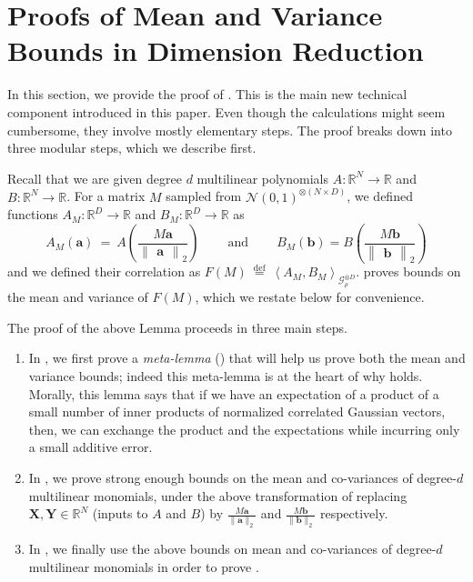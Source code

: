 \documentclass[11pt]{article}
\newcommand{\inparen}[1]{\left ( #1 \right )}
\newcommand{\inangle}[1]{\left \langle #1 \right \rangle}
\newcommand{\norm}[2]{\begin{Vmatrix} #2 \end{Vmatrix}_{#1}}
\newcommand{\defeq}{\stackrel{\mathrm{def}}{=}}
\newcommand{\sAND}{\ \mathrm{and} \ }
\newcommand{\bbR}{{\mathbb R}}
\newcommand{\ba}{{\bm a}}
\newcommand{\bb}{{\bm b}}
\newcommand{\bX}{\mathbf{X}}
\newcommand{\bY}{\mathbf{Y}}
\newcommand{\calG}{\mathcal{G}}
\newcommand{\calN}{\mathcal{N}}
\begin{document}
%
%



\appendix

\section{Proofs of Mean and Variance Bounds in Dimension Reduction}\label{sec:app_dim_red}

In this section, we provide the proof of . This is the main new technical component introduced in this paper. Even though the calculations might seem cumbersome, they involve mostly elementary steps. The proof breaks down into three modular steps, which we describe first.

Recall that we are given degree $d$ multilinear polynomials $A : \bbR^N \to \bbR$ and $B : \bbR^N \to \bbR$. For a matrix $M$ sampled from $\calN(0,1)^{\otimes (N \times D)}$, we defined functions $A_M : \bbR^D \to \bbR$ and $B_M : \bbR^D \to \bbR$ as
\[A_M(\ba) ~=~ A\inparen{\frac{M \ba}{\norm{2}{\ba}}} \qquad \sAND \qquad B_M(\bb) = B\inparen{\frac{M \bb}{\norm{2}{\bb}}}\]
and we defined their correlation as $F(M) ~\defeq~ \inangle{A_M, B_M}_{\calG_{\rho}^{\otimes D}}$.  proves bounds on the mean and variance of $F(M)$, which we restate below for convenience.

\meanvarbound*

\noindent The proof of the above Lemma proceeds in three main steps.
\begin{enumerate}
	\item In , we first prove a {\em meta-lemma} () that will help us prove both the mean and variance bounds; indeed this meta-lemma is at the heart of why  holds. Morally, this lemma says that if we have an expectation of a product of a small number of inner products of normalized correlated Gaussian vectors, then, we can exchange the product and the expectations while incurring only a small additive error.
	\item In , we prove strong enough bounds on the mean and co-variances of degree-$d$ multilinear monomials, under the above transformation of replacing $\bX, \bY \in \bbR^N$ (inputs to $A$ and $B$) by $\frac{M\ba}{\|\ba\|_2}$ and $\frac{M\bb}{\|\bb\|_2}$ respectively. %
	\item In , we finally use the above bounds on mean and co-variances of degree-$d$ multilinear monomials in order to prove .
\end{enumerate}
\end{document}

